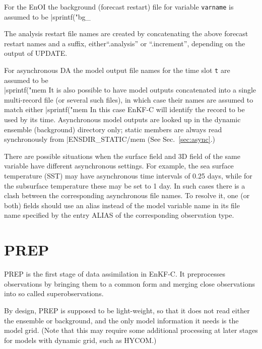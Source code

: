 \documentclass[11pt]{report}
\begin{document}
For the EnOI the background (forecast restart) file for variable \verb|varname| is assumed to be \spverb|sprintf("bg_%

The analysis restart file names are created by concatenating the above forecast restart names and a suffix, either``.analysis'' or ``.increment'', depending on the output of UPDATE.

For asynchronous DA the model output file names for the time slot \verb|t| are assumed to be \\\spverb|sprintf("mem%
It is also possible to have model outputs concatenated into a single multi-record file (or several such files), in which case their names are assumed to match either \spverb|sprintf("mem%
In this case EnKF-C will identify the record to be used by its time.
Asynchronous model outputs are looked up in the dynamic ensemble (background) directory only; static members are always read synchronously from \spverb|ENSDIR_STATIC/mem%
(See Sec.~\ref{sec:async}.)

There are possible situations when the surface field and 3D field of the same variable have different asynchronous settings.
For example, the sea surface temperature (SST) may have asynchronous time intervals of 0.25 days, while for the subsurface temperature these may be set to 1 day.
In such cases there is a clash between the corresponding asynchronous file names.
To resolve it, one (or both) fields should use an alias instead of the model variable name in its file name specified by the entry ALIAS of the corresponding observation type.

\section{PREP}

PREP is the first stage of data assimilation in EnKF-C.
It preprocesses observations by bringing them to a common form and merging close observations into so called superobservations.

By design, PREP is supposed to be light-weight, so that it does not read either the ensemble or background, and the only model information it needs is the model grid. 
(Note that this may require some additional processing at later stages for models with dynamic grid, such as HYCOM.)
\end{document}
